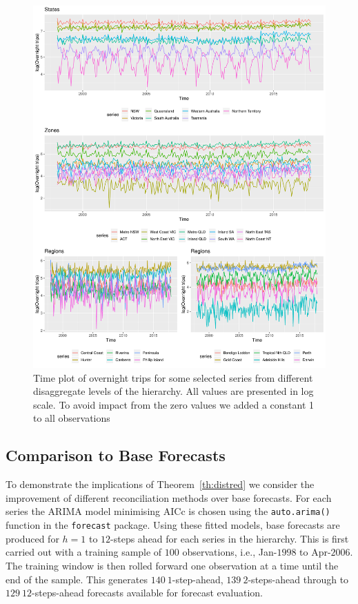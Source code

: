 \documentclass[12pt]{article}
\theoremstyle{definition}
\begin{document}
\begin{figure}
  \centering
  \small
  \includegraphics[width= .95\textwidth]{Empirical-results/TS-plots/States_Zones_Regs_TSplots1.pdf}
  \caption{Time plot of overnight trips for some selected series from different disaggregate levels of the hierarchy. All values are presented in log scale. To avoid impact from the zero values we added a constant 1 to all observations}\label{fig:States_Zones_Regs_TSplots}
\end{figure}

\subsection{Comparison to Base Forecasts}\label{sec:comparebase}

To demonstrate the implications of Theorem~\ref{th:distred} we consider the improvement of different reconciliation methods over base forecasts. For each series the ARIMA model minimising AICc is chosen using the \verb|auto.arima()| function in the \verb|forecast| package. Using these fitted models, base forecasts are produced for $h=1$ to $12$-steps ahead for each series in the hierarchy. This is first carried out with a training sample of $100$ observations, i.e., Jan-$1998$ to Apr-$2006$. The training window is then rolled forward one observation at a time until the end of the sample. This generates $140~1$-step-ahead, $139~2$-steps-ahead through to $129~12$-steps-ahead forecasts available for forecast evaluation.
\end{document}
